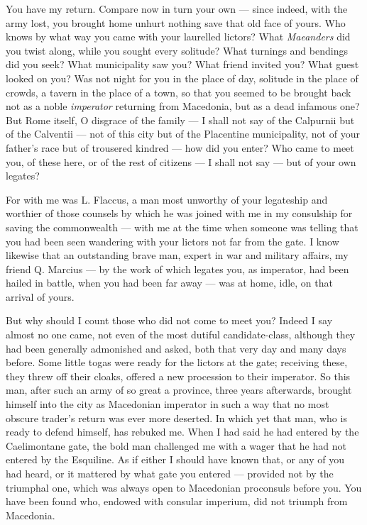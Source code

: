  You have my return. Compare now in turn your own — since indeed, with the army lost, you brought home unhurt nothing save that old face of yours. Who knows by what way you came with your laurelled lictors? What \textit{Maeanders} did you twist along, while you sought every solitude? What turnings and bendings did you seek? What municipality saw you? What friend invited you? What guest looked on you? Was not night for you in the place of day, solitude in the place of crowds, a tavern in the place of a town, so that you seemed to be brought back not as a noble \textit{imperator} returning from Macedonia, but as a dead infamous one? But Rome itself, O disgrace of the family — I shall not say of the Calpurnii but of the Calventii — not of this city but of the Placentine municipality, not of your father's race but of trousered kindred — how did you enter? Who came to meet you, of these here, or of the rest of citizens — I shall not say — but of your own legates?

 For with me was L. Flaccus, a man most unworthy of your legateship and worthier of those counsels by which he was joined with me in my consulship for saving the commonwealth — with me at the time when someone was telling that you had been seen wandering with your lictors not far from the gate. I know likewise that an outstanding brave man, expert in war and military affairs, my friend Q. Marcius — by the work of which legates you, as imperator, had been hailed in battle, when you had been far away — was at home, idle, on that arrival of yours.

 But why should I count those who did not come to meet you? Indeed I say almost no one came, not even of the most dutiful candidate-class, although they had been generally admonished and asked, both that very day and many days before. Some little togas were ready for the lictors at the gate; receiving these, they threw off their cloaks, offered a new procession to their imperator. So this man, after such an army of so great a province, three years afterwards, brought himself into the city as Macedonian imperator in such a way that no most obscure trader's return was ever more deserted. In which yet that man, who is ready to defend himself, has rebuked me. When I had said he had entered by the Caelimontane gate, the bold man challenged me with a wager that he had not entered by the Esquiline. As if either I should have known that, or any of you had heard, or it mattered by what gate you entered — provided not by the triumphal one, which was always open to Macedonian proconsuls before you. You have been found who, endowed with consular imperium, did not triumph from Macedonia.


